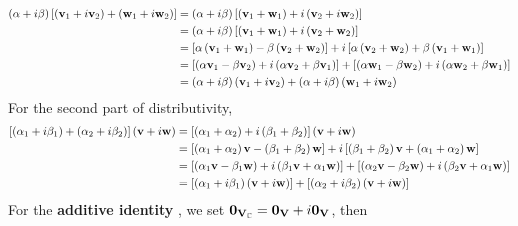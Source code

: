 \begin{solution}
\begin{align*}
    \left( \alpha + i \beta \right) \left[ \left( \vb{v}_{1} + i \vb{v}_{2} \right) + \left( \vb{w}_{1} + i \vb{w}_{2} \right) \right] &=   \left( \alpha + i \beta \right)  \left[ \left( \vb{v}_{1} + \vb{w}_{1} \right) + i \left( \vb{v}_{2} + i\vb{w}_{2} \right) \right] \\ 
    &= \left( \alpha + i \beta \right) \left[\left(  \vb{v}_{1} + \vb{w}_{1} \right) + i \left( \vb{v}_{2} + \vb{w}_{2} \right) \right] \\
    &= \left[ \alpha \left( \vb{v}_{1} + \vb{w}_{1} \right) - \beta \left( \vb{v}_{2} + \vb{w}_{2} \right) \right] + i \left[ \alpha \left( \vb{v}_{2} + \vb{w}_{2} \right) + \beta  \left( \vb{v}_{1} + \vb{w}_{1} \right) \right] \\
    &= \left[ \left( \alpha \vb{v}_{1} - \beta \vb{v}_{2} \right)+ i \left( \alpha \vb{v}_{2} + \beta \vb{v}_{1} \right)\right] +  \left[ \left( \alpha \vb{w}_{1} - \beta \vb{w}_{2} \right)+ i \left( \alpha \vb{w}_{2} + \beta \vb{w}_{1} \right)\right] \\
    &= \left( \alpha + i \beta \right) \left( \vb{v}_{1} + i\vb{v}_{2} \right) +  \left( \alpha + i \beta \right) \left( \vb{w}_{1} + i\vb{w}_{2} \right)
  \end{align*}
   For the second part of distributivity, 
   \begin{align*}
    \left[ \left(  \alpha_{1} + i \beta_{1}  \right) + \left(  \alpha_{2} + i \beta_{2}  \right)\right] \left( \vb{v} + i \vb{w} \right) &= \left[ \left( \alpha_{1} + \alpha_{2}\right) + i \left( \beta_{1} + \beta_{2} \right) \right] \left( \vb{v}+ i \vb{w} \right) \\
    &= \left[ \left( \alpha_{1} + \alpha_{2} \right) \vb{v} - \left( \beta_{1}+ \beta_{2} \right) \vb{w}\right] + i \left[ \left( \beta_{1} + \beta_{2} \right) \vb{v} + \left( \alpha_{1} + \alpha_{2} \right) \vb{w} \right] \\
    &=\left[ \left( \alpha_{1} \vb{v} - \beta_{1} \vb{w} \right) + i \left( \beta_{1} \vb{v} + \alpha_{1} \vb{w} \right) \right] +\left[ \left( \alpha_{2} \vb{v} - \beta_{2} \vb{w} \right) + i \left( \beta_{2} \vb{v} + \alpha_{1} \vb{w} \right) \right] \\
    &=\left[ \left(  \alpha_{1} + i \beta_{1}  \right)\left( \vb{v} + i \vb{w} \right)  \right] + \left[  \left(  \alpha_{2} + i \beta_{2}  \right) \left( \vb{v} + i \vb{w} \right) \right]
   \end{align*}
  For the \textbf{additive identity} , we set \( \vb{0}_{\mathbf{V}_{\mathbb{C}}} = \vb{0}_{\mathbf{V}} + i \vb{0}_{\mathbf{V}} \), then 

\end{solution}
